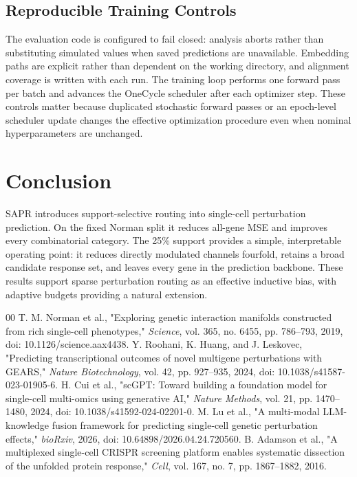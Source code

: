 \documentclass[conference]{IEEEtran}
\newcommand{\method}{SAPR}
\begin{document}
\subsection{Reproducible Training Controls}
The evaluation code is configured to fail closed: analysis aborts rather than
substituting simulated values when saved predictions are unavailable.
Embedding paths are explicit rather than dependent on the working directory,
and alignment coverage is written with each run. The training loop performs
one forward pass per batch and advances the OneCycle scheduler after each
optimizer step. These controls matter because duplicated stochastic forward
passes or an epoch-level scheduler update changes the effective optimization
procedure even when nominal hyperparameters are unchanged.

\section{Conclusion}
\method{} introduces support-selective routing into single-cell perturbation
prediction. On the fixed Norman split it reduces all-gene MSE and improves
every combinatorial category. The 25\% support provides a simple, interpretable
operating point: it reduces directly modulated channels fourfold, retains a
broad candidate response set, and leaves every gene in the prediction
backbone. These results support sparse perturbation routing as an effective
inductive bias, with adaptive budgets providing a natural extension.

\begin{thebibliography}{00}
T. M. Norman et al., "Exploring genetic interaction manifolds constructed
from rich single-cell phenotypes," \emph{Science}, vol. 365, no. 6455,
pp. 786--793, 2019, doi: 10.1126/science.aax4438.
Y. Roohani, K. Huang, and J. Leskovec, "Predicting transcriptional outcomes
of novel multigene perturbations with GEARS," \emph{Nature Biotechnology},
vol. 42, pp. 927--935, 2024, doi: 10.1038/s41587-023-01905-6.
H. Cui et al., "scGPT: Toward building a foundation model for single-cell
multi-omics using generative AI," \emph{Nature Methods}, vol. 21,
pp. 1470--1480, 2024, doi: 10.1038/s41592-024-02201-0.
M. Lu et al., "A multi-modal LLM-knowledge fusion framework for predicting
single-cell genetic perturbation effects," \emph{bioRxiv}, 2026,
doi: 10.64898/2026.04.24.720560.
B. Adamson et al., "A multiplexed single-cell CRISPR screening platform
enables systematic dissection of the unfolded protein response,"
\emph{Cell}, vol. 167, no. 7, pp. 1867--1882, 2016.
\end{thebibliography}
\end{document}
